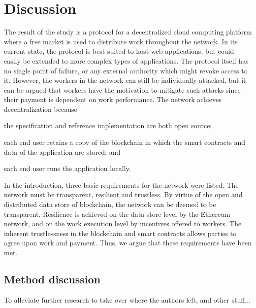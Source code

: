 \chapter{Discussion}
The result of the study is a protocol for a decentralized cloud computing platform where a free market is used to distribute work throughout the network. In its current state, the protocol is best suited to host web applications, but could easily be extended to more complex types of applications. The protocol itself has no single point of failure, or any external authority which might revoke access to it. However, the workers in the network can still be individually attacked, but it can be argued that workers have the motivation to mitigate such attacks since their payment is dependent on work performance.
The network achieves decentralization because
\begin{inparaenum}
\item the specification and reference implementation are both open source;
\item each end user retains a copy of the blockchain in which the smart contracts and data of the application are stored; and
\item each end user runs the application locally. 
\end{inparaenum}

In the introduction, three basic requirements for the network were listed. The network must be transparent, resilient and trustless. By virtue of the open and distributed data store of blockchain, the network can be deemed to be transparent. Resilience is achieved on the data store level by the Ethereum network, and on the work execution level by incentives offered to workers. The inherent trustlessness in the blockchain and smart contracts allows parties to agree upon work and payment. Thus, we argue that these requirements have been met.

\section{Method discussion}
To alleviate further research to take over where the authors left, and other stuff...

